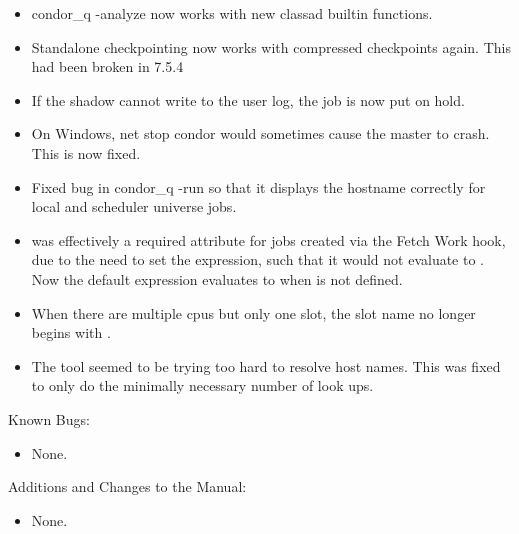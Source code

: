 \begin{itemize}
\item condor\_q -analyze now works with new classad builtin functions.

\item Standalone checkpointing now works with compressed checkpoints again.
This had been broken in 7.5.4

\item If the shadow cannot write to the user log, the job
is now put on hold.

\item On Windows, net stop condor would sometimes cause the
master to crash.  This is now fixed.

\item Fixed bug in condor\_q -run so that it displays
the hostname correctly for local and scheduler universe jobs.

\item {} was effectively a required attribute for
  jobs created via the Fetch Work hook,
  due to the need to set the 
  expression, such that it would not evaluate to .
  Now the default  expression
  evaluates to  when  is not defined.

\item When there are multiple cpus but only one slot, the slot name no
longer begins with .

\item The tool  seemed to be trying too hard to resolve
host names. This was fixed to only do the minimally necessary 
number of look ups.

\end{itemize}

\noindent Known Bugs:

\begin{itemize}

\item None.

\end{itemize}

\noindent Additions and Changes to the Manual:

\begin{itemize}

\item None.

\end{itemize}

